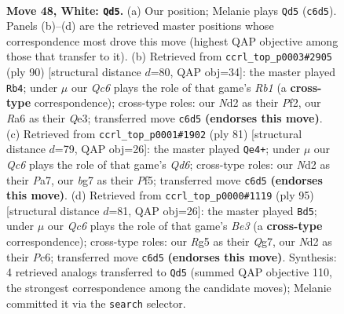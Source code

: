 \documentclass[11pt]{article}
\begin{document}
\clearpage

\begin{figure}[p]\centering
\begin{subfigure}{0.46\textwidth}\centering
\resizebox{\linewidth}{!}{%
\newchessgame
\chessboard[
  setfen={3r2k1/1r3pb1/R1Q5/1n2p1R1/4P3/3K4/3N2N1/6q1 w - - 6 48},
  showmover=false,
  pgfstyle=straightmove, color=movearrow, markmove={c6-d5}
]}
\caption{}
\end{subfigure}\hfill
\begin{subfigure}{0.46\textwidth}\centering
\resizebox{\linewidth}{!}{%
\newchessgame
\chessboard[
  setfen={2kb2R1/p7/r7/3rpq2/2p1N2P/2P1Q3/5PK1/1R6 w - - 0 46},
  showmover=false,
  pgfstyle=straightmove, color=movearrow, markmove={b1-b4}
]}
\caption{}
\end{subfigure}
\\[4pt]
\begin{subfigure}{0.46\textwidth}\centering
\resizebox{\linewidth}{!}{%
\newchessgame
\chessboard[
  setfen={8/p5rk/2PQ4/3n1p2/5P2/3qp3/P3R3/5B1K b - - 6 41},
  showmover=false,
  pgfstyle=straightmove, color=movearrow, markmove={d3-e4}
]}
\caption{}
\end{subfigure}\hfill
\begin{subfigure}{0.46\textwidth}\centering
\resizebox{\linewidth}{!}{%
\newchessgame
\chessboard[
  setfen={8/1Qn3qk/2p1b1p1/r6p/P7/5RPP/5P2/4R1K1 b - - 1 48},
  showmover=false,
  pgfstyle=straightmove, color=movearrow, markmove={e6-d5}
]}
\caption{}
\end{subfigure}
\caption{\textbf{Move 48, White: \texttt{Qd5}.} (a) Our position; Melanie plays \texttt{Qd5} (\texttt{c6d5}). Panels (b)--(d) are the retrieved master positions whose correspondence most drove this move (highest QAP objective among those that transfer to it). (b) Retrieved from \texttt{ccrl\_top\_p0003\#2905} (ply 90) [structural distance $d$=80, QAP obj=34]: the master played \texttt{Rb4}; under $\mu$ our \emph{Qc6} plays the role of that game's \emph{Rb1} (a \textbf{cross-type} correspondence); cross-type roles: our \emph{N}d2 as their \emph{P}f2, our \emph{R}a6 as their \emph{Q}e3; transferred move \texttt{c6d5} \textbf{(endorses this move)}. (c) Retrieved from \texttt{ccrl\_top\_p0001\#1902} (ply 81) [structural distance $d$=79, QAP obj=26]: the master played \texttt{Qe4+}; under $\mu$ our \emph{Qc6} plays the role of that game's \emph{Qd6}; cross-type roles: our \emph{N}d2 as their \emph{P}a7, our \emph{b}g7 as their \emph{P}f5; transferred move \texttt{c6d5} \textbf{(endorses this move)}. (d) Retrieved from \texttt{ccrl\_top\_p0000\#1119} (ply 95) [structural distance $d$=81, QAP obj=26]: the master played \texttt{Bd5}; under $\mu$ our \emph{Qc6} plays the role of that game's \emph{Be3} (a \textbf{cross-type} correspondence); cross-type roles: our \emph{R}g5 as their \emph{Q}g7, our \emph{N}d2 as their \emph{P}c6; transferred move \texttt{c6d5} \textbf{(endorses this move)}. Synthesis: 4 retrieved analogs transferred to \texttt{Qd5} (summed QAP objective 110, the strongest correspondence among the candidate moves); Melanie committed it via the \texttt{search} selector.}
\label{fig:thought-m94}
\end{figure}
\end{document}
